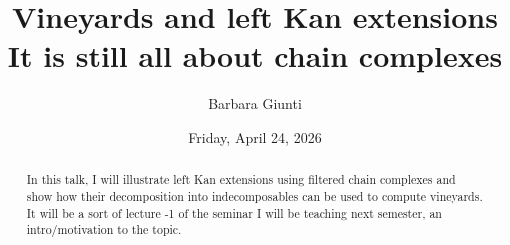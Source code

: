 \documentclass{UAmathtalk}
\author{Barbara Giunti}
\title{Vineyards and left Kan extensions \\ {\large It is still all about chain complexes}}
\date{Friday, April 24, 2026}
\begin{document}
\maketitle
\begin{abstract}
In this talk, I will illustrate left Kan extensions using filtered chain complexes and show how their decomposition into indecomposables can be used to compute vineyards. It will be a sort of lecture -1 of the seminar I will be teaching next semester, an intro/motivation to the topic.
\end{abstract}
\end{document}
